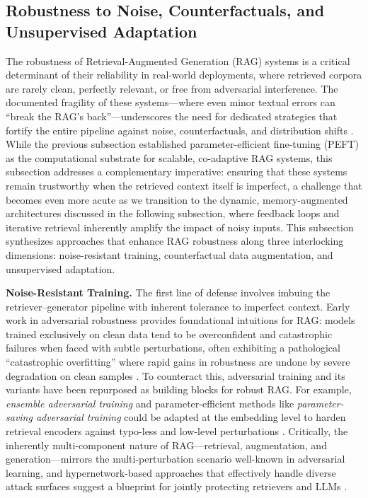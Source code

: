 \documentclass[11pt]{article}
\begin{document}
\subsection{Robustness to Noise, Counterfactuals, and Unsupervised Adaptation}

The robustness of Retrieval-Augmented Generation (RAG) systems is a critical determinant of their reliability in real-world deployments, where retrieved corpora are rarely clean, perfectly relevant, or free from adversarial interference. The documented fragility of these systems---where even minor textual errors can ``break the RAG's back''---underscores the need for dedicated strategies that fortify the entire pipeline against noise, counterfactuals, and distribution shifts \cite{ref97}. While the previous subsection established parameter-efficient fine-tuning (PEFT) as the computational substrate for scalable, co-adaptive RAG systems, this subsection addresses a complementary imperative: ensuring that these systems remain trustworthy when the retrieved context itself is imperfect, a challenge that becomes even more acute as we transition to the dynamic, memory-augmented architectures discussed in the following subsection, where feedback loops and iterative retrieval inherently amplify the impact of noisy inputs. This subsection synthesizes approaches that enhance RAG robustness along three interlocking dimensions: noise-resistant training, counterfactual data augmentation, and unsupervised adaptation.

\textbf{Noise-Resistant Training.} The first line of defense involves imbuing the retriever--generator pipeline with inherent tolerance to imperfect context. Early work in adversarial robustness provides foundational intuitions for RAG: models trained exclusively on clean data tend to be overconfident and catastrophic failures when faced with subtle perturbations, often exhibiting a pathological ``catastrophic overfitting'' where rapid gains in robustness are undone by severe degradation on clean samples \cite{ref98}. To counteract this, adversarial training and its variants have been repurposed as building blocks for robust RAG. For example, \emph{ensemble adversarial training} and parameter-efficient methods like \emph{parameter-saving adversarial training} could be adapted at the embedding level to harden retrieval encoders against typo-less and low-level perturbations \cite{ref99,ref100}. Critically, the inherently multi-component nature of RAG---retrieval, augmentation, and generation---mirrors the multi-perturbation scenario well-known in adversarial learning, and hypernetwork-based approaches that effectively handle diverse attack surfaces suggest a blueprint for jointly protecting retrievers and LLMs \cite{ref100}.
\end{document}
